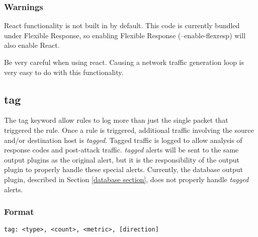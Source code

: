 \documentclass[english]{report}
\begin{document}
\subsubsection{Warnings}

React functionality is not built in by default.  This code is currently bundled
under Flexible Response, so enabling Flexible Response (--enable-flexresp)
will also enable React.  

Be very careful when using react.  Causing a network traffic generation
loop is very easy to do with this functionality.


\subsection{tag \label{tag section}}

The tag keyword allow rules to log more than just the single packet that
triggered the rule. Once a rule is triggered, additional traffic involving the
source and/or destination host is \emph{tagged}. Tagged traffic is logged to
allow analysis of response codes and post-attack traffic.  \emph{tagged} alerts
will be sent to the same output plugins as the original alert, but it is the
responsibility of the output plugin to properly handle these special alerts.
Currently, the database output plugin, described in Section \ref{database 
section}, does not properly handle \emph{tagged} alerts.


\subsubsection{Format}

\begin{verbatim}
tag: <type>, <count>, <metric>, [direction]
\end{verbatim}
\end{document}

